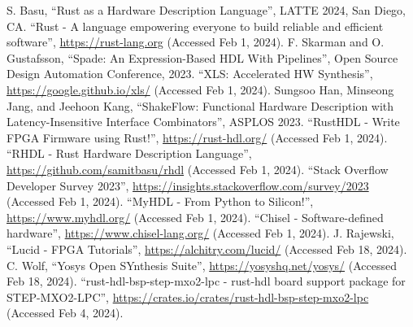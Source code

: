 \documentclass[sigplan,screen,sigconf]{acmart}
\begin{document}
\begin{thebibliography}{00}
   S. Basu, ``Rust as a Hardware Description Language'', LATTE 2024, San Diego, CA.
   ``Rust - A language empowering everyone to build reliable and efficient software'', \url{https://rust-lang.org} (Accessed Feb 1, 2024).
   F. Skarman and O. Gustafsson, ``Spade: An Expression-Based HDL With Pipelines'', Open Source Design Automation Conference, 2023.
   ``XLS: Accelerated HW Synthesis'', \url{https://google.github.io/xls/} (Accessed Feb 1, 2024).
   Sungsoo Han, Minseong Jang, and Jeehoon Kang, ``ShakeFlow: Functional Hardware Description with Latency-Insensitive Interface Combinators'', ASPLOS 2023.
   ``RustHDL - Write FPGA Firmware using Rust!'', \url{https://rust-hdl.org/} (Accessed Feb 1, 2024).
   ``RHDL - Rust Hardware Description Language'', \url{https://github.com/samitbasu/rhdl} (Accessed Feb 1, 2024).
   ``Stack Overflow Developer Survey 2023'', \url{https://insights.stackoverflow.com/survey/2023} (Accessed Feb 1, 2024).
   ``MyHDL - From Python to Silicon!'', \url{https://www.myhdl.org/} (Accessed Feb 1, 2024).
   ``Chisel - Software-defined hardware'', \url{https://www.chisel-lang.org/} (Accessed Feb 1, 2024).
   J. Rajewski, ``Lucid - FPGA Tutorials'', \url{https://alchitry.com/lucid/} (Accessed Feb 18, 2024).
   C. Wolf, ``Yosys Open SYnthesis Suite'', \url{https://yosyshq.net/yosys/} (Accessed Feb 18, 2024).
   ``rust-hdl-bsp-step-mxo2-lpc - rust-hdl board support package for STEP-MXO2-LPC'', \url{https://crates.io/crates/rust-hdl-bsp-step-mxo2-lpc} (Accessed Feb 4, 2024).
\end{thebibliography}
\end{document}
